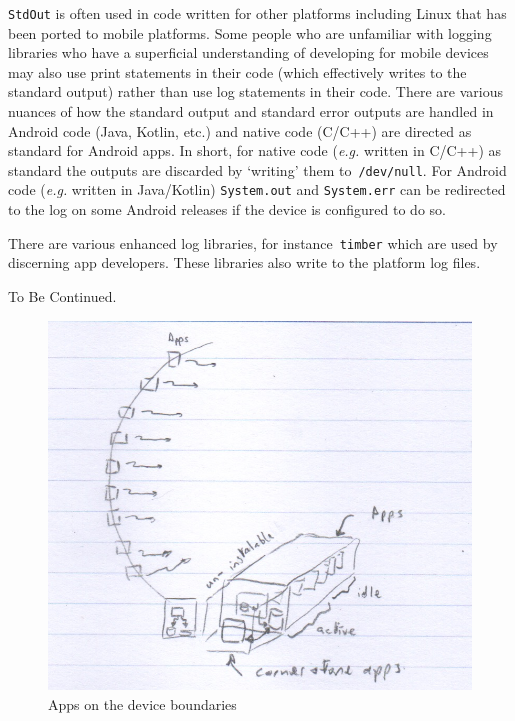 \texttt{StdOut} is often used in code written for other platforms including Linux that has been ported to mobile platforms. Some people who are unfamiliar with logging libraries who have a superficial understanding of developing for mobile devices may also use print statements in their code (which effectively writes to the standard output) rather than use log statements in their code. There are various nuances of how the standard output and standard error outputs are handled in Android code (Java, Kotlin, etc.) and native code (C/C++) are directed as standard for Android apps. In short, for native code (\emph{e.g.} written in C/C++) as standard the outputs are discarded by `writing' them to~\texttt{/dev/null}. For Android code (\emph{e.g.} written in Java/Kotlin) \texttt{System.out} and \texttt{System.err} can be redirected to the log on some Android releases if the device is configured to do so.

There are various enhanced log libraries, for instance~\texttt{timber} which are used by discerning app developers. These libraries also write to the platform log files. 

To Be Continued. %

\begin{figure}[htbp!]
    \centering
    \includegraphics[width=12cm]{images/rough-sketches/apps-on-device-boundaries-sketch.jpeg}
    \caption{Apps on the device boundaries}
    \label{fig:apps-on-device-boundaries}
\end{figure}

